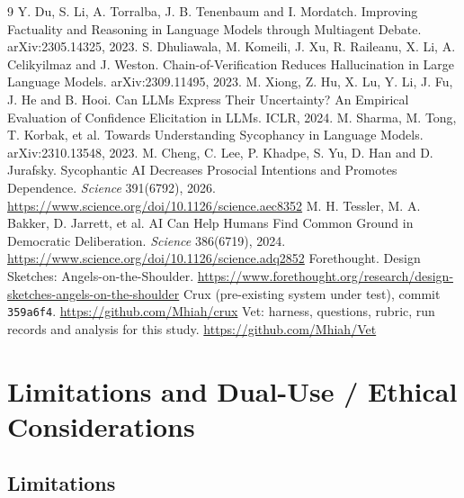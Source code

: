\documentclass[11pt]{article}
\begin{document}
\begin{thebibliography}{9}\small
{} Y. Du, S. Li, A. Torralba, J. B. Tenenbaum and I. Mordatch. Improving Factuality and Reasoning in Language Models through Multiagent Debate. arXiv:2305.14325, 2023.
 S. Dhuliawala, M. Komeili, J. Xu, R. Raileanu, X. Li, A. Celikyilmaz and J. Weston. Chain-of-Verification Reduces Hallucination in Large Language Models. arXiv:2309.11495, 2023.
 M. Xiong, Z. Hu, X. Lu, Y. Li, J. Fu, J. He and B. Hooi. Can LLMs Express Their Uncertainty? An Empirical Evaluation of Confidence Elicitation in LLMs. ICLR, 2024.
 M. Sharma, M. Tong, T. Korbak, et al. Towards Understanding Sycophancy in Language Models. arXiv:2310.13548, 2023.
 M. Cheng, C. Lee, P. Khadpe, S. Yu, D. Han and D. Jurafsky. Sycophantic AI Decreases Prosocial Intentions and Promotes Dependence. \emph{Science} 391(6792), 2026. \url{https://www.science.org/doi/10.1126/science.aec8352}
 M. H. Tessler, M. A. Bakker, D. Jarrett, et al. AI Can Help Humans Find Common Ground in Democratic Deliberation. \emph{Science} 386(6719), 2024. \url{https://www.science.org/doi/10.1126/science.adq2852}
 Forethought. Design Sketches: Angels-on-the-Shoulder. \url{https://www.forethought.org/research/design-sketches-angels-on-the-shoulder}
 Crux (pre-existing system under test), commit \texttt{359a6f4}. \url{https://github.com/Mhiah/crux}
 Vet: harness, questions, rubric, run records and analysis for this study. \url{https://github.com/Mhiah/Vet}
\end{thebibliography}

\appendix

\section{Limitations and Dual-Use / Ethical Considerations}
\label{sec:limits}

\subsection*{Limitations}
\end{document}
